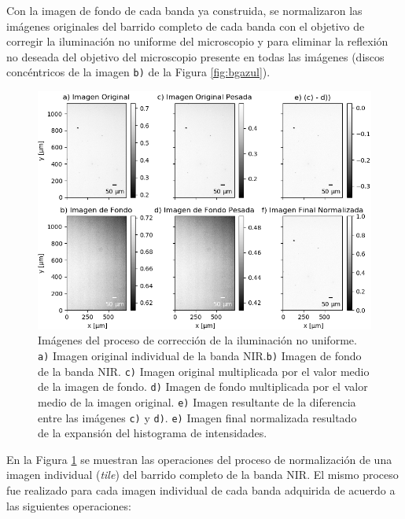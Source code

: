 \hspace{0.5cm} Con la imagen de fondo de cada banda ya construida, se normalizaron las imágenes originales del barrido completo de cada banda\cite{Nordenfelt} con el objetivo de corregir la iluminación no uniforme del microscopio y para eliminar la reflexión no deseada del objetivo del microscopio presente en todas las imágenes (discos concéntricos de la imagen \texttt{b)} de la Figura \ref{fig:bgazul}).
\begin{figure}[H]
	\centering
\includegraphics[scale=0.98]{Figs/defectosZEISS/correccionilum/NIR/1.png}
\caption{Imágenes del proceso de corrección de la iluminación no uniforme. \texttt{a)} Imagen original individual de la banda NIR.\texttt{b)} Imagen de fondo de la banda NIR. \texttt{c)} Imagen original multiplicada por el valor medio de la imagen de fondo. \texttt{d)} Imagen de fondo multiplicada por el valor medio de la imagen original. \texttt{e)} Imagen resultante de la diferencia entre las imágenes \texttt{c)} y \texttt{d)}. \texttt{e)} Imagen final normalizada resultado de la expansión del histograma de intensidades.}
\label{fig:correcilumims}
\end{figure}	
 En la Figura \ref{fig:correcilumims} se muestran las operaciones del proceso de normalización de una imagen individual (\textit{tile}) del barrido completo de la banda NIR. El mismo proceso fue realizado para cada imagen individual de cada banda adquirida de acuerdo a las siguientes operaciones:
